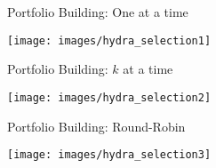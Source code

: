 \begin{frame}[c]{\hydra{} Portfolio Building: One at a time~}

\texttt{[image: images/hydra\_selection1]}

\end{frame}
\begin{frame}[c]{\hydra{} Portfolio Building: $k$ at a time~}

\texttt{[image: images/hydra\_selection2]}

\end{frame}
\begin{frame}[c]{\hydra{} Portfolio Building: Round-Robin~}

\texttt{[image: images/hydra\_selection3]}

\end{frame}

